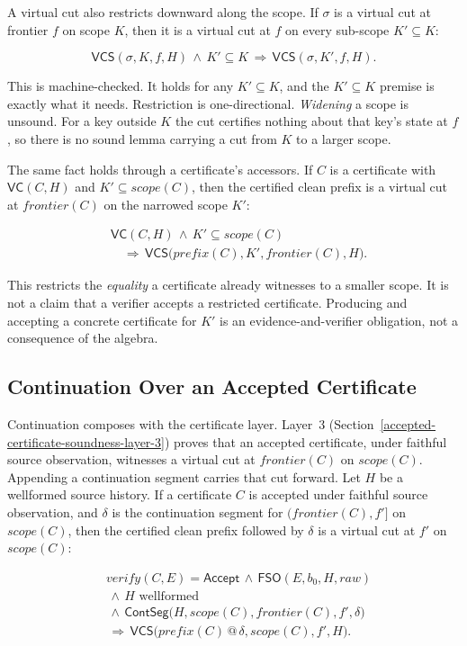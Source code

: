 \documentclass[letterpaper,10pt,twocolumn]{article}
\newcommand{\Scope}{\mathit{scope}}
\newcommand{\Frontier}{\mathit{frontier}}
\newcommand{\CleanPrefix}{\mathit{prefix}}
\newcommand{\Verify}{\mathit{verify}}
\newcommand{\RawObs}{\mathit{raw}}
\newcommand{\FSO}{\mathsf{FSO}}
\newcommand{\VC}{\mathsf{VC}}
\newcommand{\VCS}{\mathsf{VCS}}
\newcommand{\ContSeg}{\mathsf{ContSeg}}
\newcommand{\Accept}{\mathsf{Accept}}
\begin{document}
A virtual cut also restricts downward along the scope. If $\sigma$ is a
virtual cut at frontier $f$ on scope $K$, then it is a virtual cut at
$f$ on every sub-scope $K' \subseteq K$:

\[
\VCS(\sigma,K,f,H) \,\land\, K' \subseteq K
  \,\Longrightarrow\, \VCS(\sigma,K',f,H).
\]

This is machine-checked. It holds for any
$K' \subseteq K$, and the $K' \subseteq K$ premise is exactly what it
needs. Restriction is one-directional. \emph{Widening} a scope is
unsound. For a key outside $K$ the cut certifies nothing about that
key's state at $f$, so there is no sound lemma carrying a cut from $K$
to a larger scope.

The same fact holds through a certificate's accessors. If $C$ is a
certificate with $\VC(C,H)$ and $K' \subseteq \Scope(C)$, then the
certified clean prefix is a virtual cut at $\Frontier(C)$ on the
narrowed scope $K'$:

\[
\begin{aligned}
&\VC(C,H) \,\land\, K' \subseteq \Scope(C)\\
&\quad\Longrightarrow\,
  \VCS\bigl(\CleanPrefix(C),K',\Frontier(C),H\bigr).
\end{aligned}
\]

This restricts the \emph{equality} a certificate already witnesses to a
smaller scope. It is not a claim that a verifier accepts a restricted
certificate. Producing and accepting a concrete certificate for $K'$ is
an evidence-and-verifier obligation, not a consequence of the algebra.

\subsection{Continuation Over an Accepted
Certificate}\label{continuation-over-an-accepted-certificate}

Continuation composes with the certificate layer. Layer~3
(Section~\ref{accepted-certificate-soundness-layer-3}) proves that an
accepted certificate, under faithful source observation, witnesses a
virtual cut at $\Frontier(C)$ on $\Scope(C)$. Appending a continuation
segment carries that cut forward. Let $H$ be a wellformed source
history. If a certificate $C$ is accepted under faithful source
observation, and $\delta$ is the continuation segment for
$(\Frontier(C),f']$ on $\Scope(C)$, then the certified clean prefix
followed by $\delta$ is a virtual cut at $f'$ on $\Scope(C)$:

\[
\begin{aligned}
&\Verify(C,E)=\Accept \,\land\, \FSO(E,b_0,H,\RawObs)\\
&\,\land\, H \text{ wellformed}\\
&\,\land\, \ContSeg\bigl(H,\Scope(C),\Frontier(C),f',\delta\bigr)\\
&\,\Longrightarrow\, \VCS\bigl(\CleanPrefix(C) \mathbin{@} \delta, \Scope(C), f', H\bigr).
\end{aligned}
\]
\end{document}

